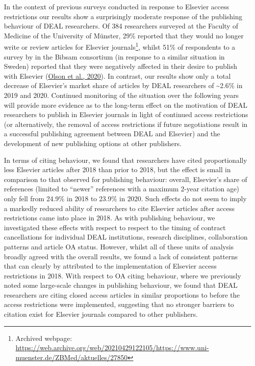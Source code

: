 \documentclass[
]{article}
\begin{document}
In the context of previous surveys conducted in response to Elsevier access restrictions our results show a surprisingly moderate response of the publishing behaviour of DEAL researchers. Of 384 researchers surveyed at the Faculty of Medicine of the University of Münster, 29\% reported that they would no longer write or review articles for Elsevier journals\footnote{Archived webpage: \url{https://web.archive.org/web/20210429122105/https://www.uni-muenster.de/ZBMed/aktuelles/27850}}, whilst 51\% of respondents to a survey by in the Bibsam consortium (in response to a similar situation in Sweden) reported that they were negatively affected in their desire to publish with Elsevier (\href{http://doi.org/10.1629/uksg.507}{Olson et al., 2020}). In contrast, our results show only a total decrease of Elsevier's market share of articles by DEAL researchers of \textasciitilde2.6\% in 2019 and 2020. Continued monitoring of the situation over the following years will provide more evidence as to the long-term effect on the motivation of DEAL researchers to publish in Elsevier journals in light of continued access restrictions (or alternatively, the removal of access restrictions if future negotiations result in a successful publishing agreement between DEAL and Elsevier) and the development of new publishing options at other publishers.

In terms of citing behaviour, we found that researchers have cited proportionally less Elsevier articles after 2018 than prior to 2018, but the effect is small in comparison to that observed for publishing behaviour: overall, Elsevier's share of references (limited to ``newer'' references with a maximum 2-year citation age) only fell from 24.9\% in 2018 to 23.9\% in 2020. Such effects do not seem to imply a markedly reduced ability of researchers to cite Elsevier articles after access restrictions came into place in 2018. As with publishing behaviour, we investigated these effects with respect to respect to the timing of contract cancellations for individual DEAL institutions, research disciplines, collaboration patterns and article OA status. However, whilst all of these units of analysis broadly agreed with the overall results, we found a lack of consistent patterns that can clearly by attributed to the implementation of Elsevier access restrictions in 2018. With respect to OA citing behaviour, where we previously noted some large-scale changes in publishing behaviour, we found that DEAL researchers are citing closed access articles in similar proportions to before the access restrictions were implemented, suggesting that no stronger barriers to citation exist for Elsevier journals compared to other publishers.
\end{document}
